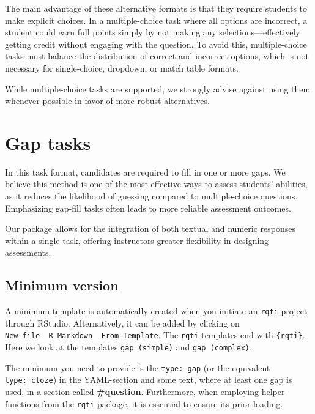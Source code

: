 \documentclass[twoside]{tufte-book}
\begin{document}
The main advantage of these alternative formats is that they require students to make explicit choices. In a multiple-choice task where all options are incorrect, a student could earn full points simply by not making any selections---effectively getting credit without engaging with the question. To avoid this, multiple-choice tasks must balance the distribution of correct and incorrect options, which is not necessary for single-choice, dropdown, or match table formats.

While multiple-choice tasks are supported, we strongly advise against using them whenever possible in favor of more robust alternatives.

\chapter{Gap tasks}\label{gap-tasks}

In this task format, candidates are required to fill in one or more gaps. We believe this method is one of the most effective ways to assess students' abilities, as it reduces the likelihood of guessing compared to multiple-choice questions. Emphasizing gap-fill tasks often leads to more reliable assessment outcomes.

Our package allows for the integration of both textual and numeric responses within a single task, offering instructors greater flexibility in designing assessments.

\section{Minimum version}\label{minimum-version-2}

A minimum template is automatically created when you initiate an \texttt{rqti} project through RStudio. Alternatively, it can be added by clicking on \texttt{New\ file\ \textrightarrow{}\ R\ Markdown\ \textrightarrow{}\ From\ Template}. The \texttt{rqti} templates end with \texttt{\{rqti\}}. Here we look at the templates \texttt{gap\ (simple)} and \texttt{gap\ (complex)}.

The minimum you need to provide is the \texttt{type:\ gap} (or the equivalent \texttt{type:\ cloze}) in the YAML-section and some text, where at least one gap is used, in a section called \textbf{\#question}. Furthermore, when employing helper functions from the \texttt{rqti} package, it is essential to ensure its prior loading.
\end{document}
